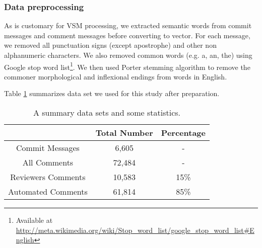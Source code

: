 %

\subsubsection{Data preprocessing}
As is customary for VSM processing, we extracted semantic words from commit messages and comment messages before converting to vector.
For each message, we removed all punctuation signs (except apostrophe) and other non alphanumeric characters. We also removed common words (e.g. a, an, the) using Google stop word list\footnote{Available at \url{http://meta.wikimedia.org/wiki/Stop_word_list/google_stop_word_list#English}}. We then used Porter stemming algorithm to remove the commoner morphological and inflexional endings from words in English.

Table \ref{tb:datastatistic} summarizes data set we used for this study after preparation. 

\begin{table}[!h]
\caption{A summary data sets and some statistics.}
\centering
\small
\begin{tabular}{ccc}
\hline
& Total Number & Percentage \\ \hline \hline
Commit Messages & 6,605 &  -  \\ \hline
All Comments & 72,484& - \\ \hline
Reviewers Comments & 10,583 & 15\% \\ \hline
Automated Comments & 61,814 & 85\% \\ \hline 

\end{tabular}
\label{tb:datastatistic}
\end{table}


